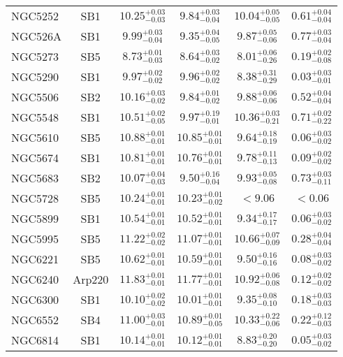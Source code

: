 \documentclass[onecolumn]{mn2e}
\begin{document}
{\begin{center}
\begin{longtable}{lccccc}
NGC5252 & SB1 & $10.25_{-0.03}^{+0.03}$ & $9.84_{-0.04}^{+0.03}$ & $10.04_{-0.05}^{+0.05}$ &$0.61_{-0.04}^{+0.04}$ \\
NGC526A & SB1 & $9.99_{-0.04}^{+0.03}$ & $9.35_{-0.05}^{+0.04}$ & $9.87_{-0.06}^{+0.05}$ &$0.77_{-0.04}^{+0.03}$ \\
NGC5273 & SB5 & $8.73_{-0.03}^{+0.01}$ & $8.64_{-0.02}^{+0.03}$ & $8.01_{-0.26}^{+0.06}$ &$0.19_{-0.08}^{+0.02}$ \\
NGC5290 & SB1 & $9.97_{-0.02}^{+0.02}$ & $9.96_{-0.02}^{+0.02}$ & $8.38_{-0.29}^{+0.31}$ &$0.03_{-0.01}^{+0.03}$ \\
NGC5506 & SB2 & $10.16_{-0.02}^{+0.03}$ & $9.84_{-0.02}^{+0.01}$ & $9.88_{-0.06}^{+0.06}$ &$0.52_{-0.04}^{+0.04}$ \\
NGC5548 & SB1 & $10.51_{-0.05}^{+0.02}$ & $9.97_{-0.01}^{+0.19}$ & $10.36_{-0.21}^{+0.03}$ &$0.71_{-0.22}^{+0.02}$ \\
NGC5610 & SB5 & $10.88_{-0.01}^{+0.01}$ & $10.85_{-0.01}^{+0.01}$ & $9.64_{-0.19}^{+0.18}$ &$0.06_{-0.02}^{+0.03}$ \\
NGC5674 & SB1 & $10.81_{-0.01}^{+0.01}$ & $10.76_{-0.01}^{+0.01}$ & $9.78_{-0.13}^{+0.11}$ &$0.09_{-0.02}^{+0.02}$ \\
NGC5683 & SB2 & $10.07_{-0.03}^{+0.04}$ & $9.50_{-0.04}^{+0.16}$ & $9.93_{-0.08}^{+0.05}$ &$0.73_{-0.11}^{+0.03}$ \\
NGC5728 & SB5 & $10.24_{-0.01}^{+0.01}$ & $10.23_{-0.02}^{+0.01}$ & $<9.06$ &$<0.06$ \\
NGC5899 & SB1 & $10.54_{-0.01}^{+0.01}$ & $10.52_{-0.01}^{+0.01}$ & $9.34_{-0.17}^{+0.17}$ &$0.06_{-0.02}^{+0.03}$ \\
NGC5995 & SB5 & $11.22_{-0.02}^{+0.02}$ & $11.07_{-0.01}^{+0.01}$ & $10.66_{-0.09}^{+0.07}$ &$0.28_{-0.04}^{+0.04}$ \\
NGC6221 & SB5 & $10.62_{-0.01}^{+0.01}$ & $10.59_{-0.01}^{+0.01}$ & $9.50_{-0.16}^{+0.16}$ &$0.08_{-0.02}^{+0.03}$ \\
NGC6240 & Arp220 & $11.83_{-0.01}^{+0.01}$ & $11.77_{-0.01}^{+0.01}$ & $10.92_{-0.08}^{+0.06}$ &$0.12_{-0.02}^{+0.02}$ \\
NGC6300 & SB1 & $10.10_{-0.02}^{+0.02}$ & $10.01_{-0.01}^{+0.01}$ & $9.35_{-0.10}^{+0.08}$ &$0.18_{-0.03}^{+0.03}$ \\
NGC6552 & SB4 & $11.00_{-0.01}^{+0.03}$ & $10.89_{-0.05}^{+0.01}$ & $10.33_{-0.06}^{+0.22}$ &$0.22_{-0.03}^{+0.12}$ \\
NGC6814 & SB1 & $10.14_{-0.01}^{+0.01}$ & $10.12_{-0.01}^{+0.01}$ & $8.83_{-0.20}^{+0.20}$ &$0.05_{-0.02}^{+0.03}$ \\

\end{longtable}
\end{center}}
\end{document}
